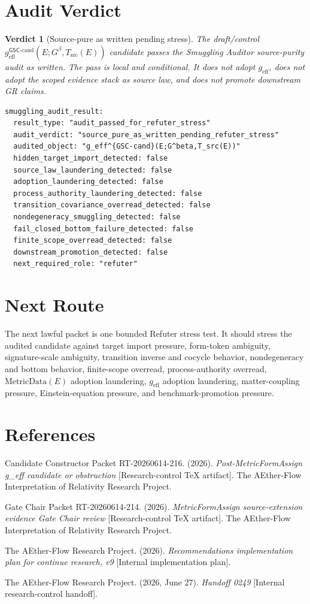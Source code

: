 \documentclass[11pt]{article}
\newcommand{\Gbeta}{G^\beta}
\newcommand{\geff}{g_{\mathrm{eff}}}
\newcommand{\geffCand}{g_{\mathrm{eff}}^{\mathsf{GSC}\mbox{-}\mathrm{cand}}}
\newtheorem{verdict}{Verdict}
\begin{document}
\section{Audit Verdict}

\begin{verdict}[Source-pure as written pending stress]
The draft/control \(\geffCand(E;\Gbeta,T_{\mathrm{src}}(E))\) candidate passes
the Smuggling Auditor source-purity audit as written. The pass is local and
conditional. It does not adopt \(\geff\), does not adopt the scoped evidence
stack as source law, and does not promote downstream GR claims.
\end{verdict}

\begin{verbatim}
smuggling_audit_result:
  result_type: "audit_passed_for_refuter_stress"
  audit_verdict: "source_pure_as_written_pending_refuter_stress"
  audited_object: "g_eff^{GSC-cand}(E;G^beta,T_src(E))"
  hidden_target_import_detected: false
  source_law_laundering_detected: false
  adoption_laundering_detected: false
  process_authority_laundering_detected: false
  transition_covariance_overread_detected: false
  nondegeneracy_smuggling_detected: false
  fail_closed_bottom_failure_detected: false
  finite_scope_overread_detected: false
  downstream_promotion_detected: false
  next_required_role: "refuter"
\end{verbatim}

\section{Next Route}

The next lawful packet is one bounded Refuter stress test. It should stress
the audited candidate against target import pressure, form-token ambiguity,
signature-scale ambiguity, transition inverse and cocycle behavior,
nondegeneracy and bottom behavior, finite-scope overread, process-authority
overread, \(\mathrm{MetricData}(E)\) adoption laundering, \(\geff\) adoption
laundering, matter-coupling pressure, Einstein-equation pressure, and
benchmark-promotion pressure.

\section{References}

Candidate Constructor Packet RT-20260614-216. (2026). \textit{Post-MetricFormAssign
g\_eff candidate or obstruction} [Research-control TeX artifact]. The
AEther-Flow Interpretation of Relativity Research Project.

Gate Chair Packet RT-20260614-214. (2026). \textit{MetricFormAssign source-extension
evidence Gate Chair review} [Research-control TeX artifact]. The AEther-Flow
Interpretation of Relativity Research Project.

The AEther-Flow Research Project. (2026). \textit{Recommendations
implementation plan for continue research, v9} [Internal implementation plan].

The AEther-Flow Research Project. (2026, June 27). \textit{Handoff 0249}
[Internal research-control handoff].
\end{document}
